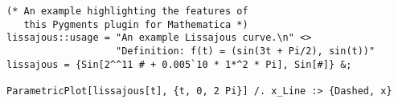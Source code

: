 \documentclass{article}
\begin{document}
\begin{verbatim}
(* An example highlighting the features of
   this Pygments plugin for Mathematica *)
lissajous::usage = "An example Lissajous curve.\n" <>
                   "Definition: f(t) = (sin(3t + Pi/2), sin(t))"
lissajous = {Sin[2^^11 # + 0.005`10 * 1*^2 * Pi], Sin[#]} &;

ParametricPlot[lissajous[t], {t, 0, 2 Pi}] /. x_Line :> {Dashed, x}
\end{verbatim}
\end{document}
